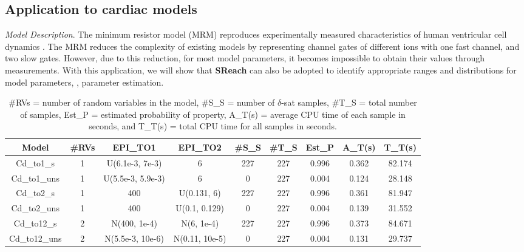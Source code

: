 \subsection{Application to cardiac models}

\textit{Model Description}.
The minimum resistor model (MRM) reproduces experimentally measured characteristics 
of human ventricular cell dynamics \cite{bueno2008minimal}. 
The MRM reduces the complexity of existing models by representing channel gates of different ions with one fast channel, and two slow gates. However, due to this reduction, for most model parameters, it becomes impossible to obtain their values through measurements. With this application, we will show that {\bf SReach} can also be adopted to identify appropriate ranges and distributions for model parameters, \ie, parameter estimation.
\begin{table}[h]
\centering
    \begin{tabular}{c|c|c|c|c|c|c|c|c}
    \hline
    Model         & \#RVs & EPI\_TO1            & EPI\_TO2         & \#S\_S & \#T\_S & Est\_P &  A\_T(s) & T\_T(s) \\ \hline
    Cd\_to1\_s    & 1     & U(6.1e-3, 7e-3)    & 6              & 227       & 227      & 0.996     & 0.362   & 82.174     \\ \hline
    Cd\_to1\_uns  & 1     & U(5.5e-3, 5.9e-3)   & 6              & 0         & 227      & 0.004     & 0.124 & 28.148       \\ \hline
    Cd\_to2\_s    & 1     & 400               & U(0.131, 6)    & 227       & 227      & 0.996     & 0.361  & 81.947      \\ \hline
    Cd\_to2\_uns  & 1     & 400               & U(0.1, 0.129)    & 0         & 227      & 0.004     & 0.139   & 31.552     \\ \hline
    Cd\_to12\_s   & 2     & N(400, 1e-4)      & N(6, 1e-4)     & 227       & 227      & 0.996     & 0.373  & 84.671      \\ \hline
    Cd\_to12\_uns & 2     & N(5.5e-3, 10e-6) & N(0.11, 10e-5) & 0         & 227      & 0.004     & 0.131  & 29.737      \\ \hline
    \end{tabular}
    \caption { \#RVs = number of random variables in the model, \#S\_S = number of $\delta$-sat samples, 
\#T\_S = total number of samples, Est\_P = estimated probability of property,  A\_T(s) = average 
CPU time of each sample in seconds, and T\_T(s) = total CPU time for all samples in seconds.}
    \label{table:cardiac}
\end{table}


